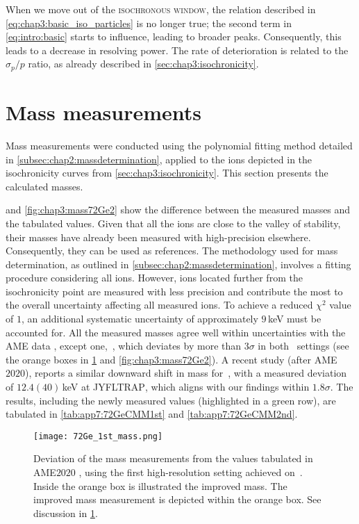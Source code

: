   When we move out of the \textsc{isochronous window}, the relation described in \cref{eq:chap3:basic_iso_particles} is no longer true; the second term in \cref{eq:intro:basic} starts to influence, leading to broader peaks. Consequently, this leads to a decrease in resolving power. The rate of deterioration is related to the $\sigma_p/p$ ratio, as already described in \cref{sec:chap3:isochronicity}. 


\section{Mass measurements}\label{sec:chap3:massmeasurements}

Mass measurements were conducted using the polynomial fitting method detailed in \cref{subsec:chap2:massdetermination}, applied to the ions depicted in the isochronicity curves from \cref{sec:chap3:isochronicity}. This section presents the calculated masses.

 and \cref{fig:chap3:mass72Ge2} show the difference between the measured masses and the tabulated values. Given that all the ions are close to the valley of stability, their masses have already been measured with high-precision elsewhere. Consequently, they can be used as references. The methodology used for mass determination, as outlined in \cref{subsec:chap2:massdetermination}, involves a fitting procedure considering all ions. However, ions located further from the isochronicity point are measured with less precision and contribute the most to the overall uncertainty affecting all measured ions. To achieve a reduced $\chi^2$ value of $1$, an additional systematic uncertainty of approximately $9$\,keV must be accounted for.
\newpar
All the measured masses agree well within uncertainties with the \textsc{AME} data \cite{AME-2020}, except one, \,, which deviates by more than $3\sigma$ in both \, settings (see the orange boxes in \cref{fig:chap3:mass72Ge1} and \cref{fig:chap3:mass72Ge2}). A recent study (after \textsc{AME$2020$}), reports a similar downward shift in mass for \,, with a measured deviation of $12.4(40)$\,keV \cite{PhysRevC.103.065502} at \textsc{JYFLTRAP}, which aligns with our findings within $1.8\sigma$.
The results, including the newly measured values (highlighted in a green row), are tabulated in \cref{tab:app7:72GeCMM1st} and \cref{tab:app7:72GeCMM2nd}.

  \begin{figure}
    \centering
    \texttt{[image: 72Ge\_1st\_mass.png]}
    \caption{Deviation of the mass measurements from the values tabulated in \textsc{AME$2020$} \cite{AME-2020}, using the first high-resolution setting achieved on \,. Inside the orange box is illustrated the improved mass. The improved mass measurement is depicted within the orange box. See discussion in \cref{sec:chap3:massmeasurements}.}
    \label{fig:chap3:mass72Ge1}
  \end{figure}
    
